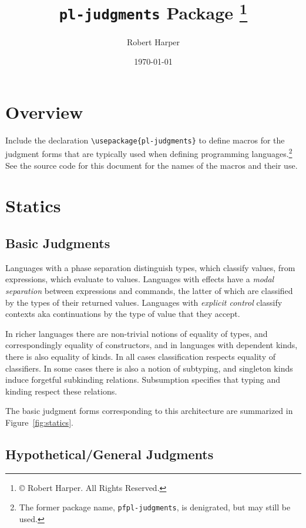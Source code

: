 \documentclass[11pt]{article}
\title{\texttt{pl-judgments} Package%
\footnote{\copyright{} \the\year{} Robert Harper.  All Rights Reserved.}}
\author{Robert Harper}
\date{\today}
\begin{document}
\maketitle{}

\section*{Overview}

Include the declaration \verb|\usepackage{pl-judgments}| to define macros for the judgment forms that are typically used when defining programming languages.\footnote{The former package name, \texttt{pfpl-judgments}, is denigrated, but may still be used.}  See the source code for this document for the names of the macros and their use.

\section*{Statics}
\label{sec:statics}

\subsection*{Basic Judgments}
\label{sec:statics-basic}

Languages with a phase separation distinguish types, which classify values, from expressions, which evaluate to values.  Languages with effects have a \emph{modal separation} between expressions and commands, the latter of which are classified by the types of their returned values.  Languages with \emph{explicit control} classify contexts aka continuations by the type of value that they accept.

In richer languages there are non-trivial notions of equality of types, and correspondingly equality of constructors, and in languages with dependent kinds, there is also equality of kinds.  In all cases classification respects equality of classifiers.  In some cases there is also a notion of subtyping, and singleton kinds induce forgetful subkinding relations.  Subsumption specifies that typing and kinding respect these relations.

The basic judgment forms corresponding to this architecture are summarized in Figure~\ref{fig:statics}.

\subsection*{Hypothetical/General Judgments}
\label{sec:statics-hypgen}
\end{document}
